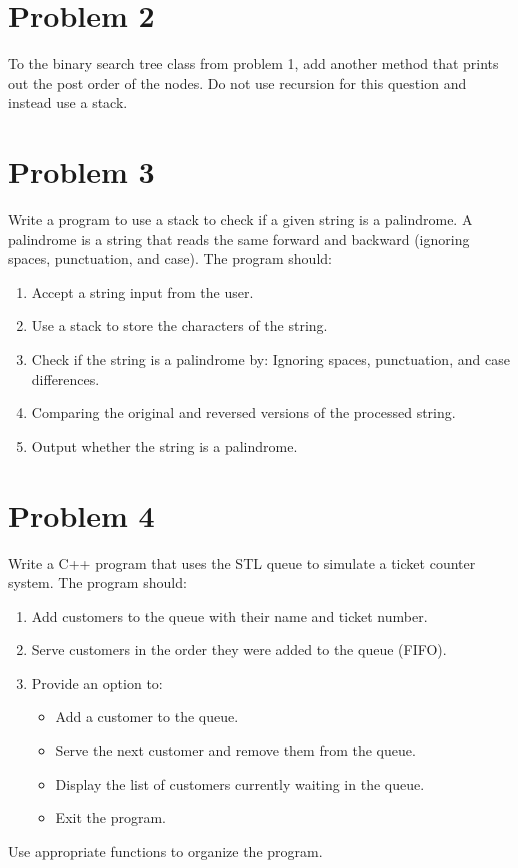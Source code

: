 \documentclass[a4paper]{article}
\begin{document}
\section*{Problem 2}
To the binary search tree class from problem 1, add another method that prints out the post order of the nodes. 
Do not use recursion for this question and instead use a stack.

\section*{Problem 3}
Write a program to use a stack to check if a given string is a palindrome. A palindrome is a string that reads the same forward and backward (ignoring spaces, punctuation, and case).
The program should:
\begin{enumerate}
        \item Accept a string input from the user.
        \item Use a stack to store the characters of the string.
        \item Check if the string is a palindrome by: Ignoring spaces, punctuation, and case differences.
        \item Comparing the original and reversed versions of the processed string.
        \item Output whether the string is a palindrome.
\end{enumerate}


\section*{Problem 4}
Write a C++ program that uses the STL queue to simulate a ticket counter system. The program should:

\begin{enumerate}
        \item Add customers to the queue with their name and ticket number.
        \item Serve customers in the order they were added to the queue (FIFO).
        \item Provide an option to:\begin{itemize}
                \item Add a customer to the queue.
                \item Serve the next customer and remove them from the queue.
                \item Display the list of customers currently waiting in the queue.
                \item Exit the program.
        \end{itemize}
\end{enumerate}
Use appropriate functions to organize the program.
\end{document}
